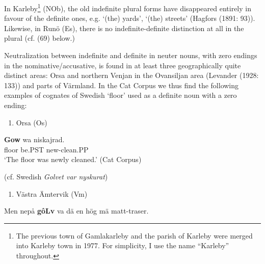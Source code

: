 In Karleby\footnote{ The previous town of Gamlakarleby and the parish of Karleby were merged into Karleby town in 1977. For simplicity, I use the name “Karleby” throughout. } (NOb), the old indefinite plural forms have disappeared entirely in favour of the definite ones, e.g.  ‘(the) yards’,  ‘(the) streets’ (Hagfors (1891: 93)). Likewise, in Runö (Es), there is no indefinite-definite distinction at all in the plural (cf. (69) below.)

Neutralization between indefinite and definite in neuter nouns, with zero endings in the nominative/accusative, is found in at least three geographically quite distinct areas: Orsa and northern Venjan in the Ovansiljan area (Levander (1928: 133)) and parts of Värmland. In the Cat Corpus we thus find the following examples of cognates of Swedish  ‘floor’ used as a definite noun with a zero ending:

\begin{enumerate} %
\item 
Orsa (Os)

\end{enumerate} %
\ea\label{}
\gll \textbf{Gow} wa  niskajrad.\\


floor  be.PST  new-clean.PP\\ %


 ‘The floor was newly cleaned.’ (Cat Corpus)
\z


(cf. Swedish \textit{Golvet var nyskurat}) 

\begin{enumerate} %
\item 
Västra Ämtervik (Vm)

\end{enumerate} %
\ea\label{}
\gll Men  nepå  \textbf{gôLv} va  dä  en  hög  mä  matt-traser.\\


